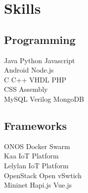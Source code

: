 \documentclass[]{deedy-resume-openfont}
\begin{document}
\begin{minipage}[t]{0.33\textwidth}
%


\section{Skills}
\subsection{Programming}
Java \textbullet{}  Python \textbullet{} Javascript \\
Android \textbullet{}  Node.js  \\
 C \textbullet{} C++ \textbullet{} VHDL \textbullet{}  PHP \\


CSS \textbullet{} Assembly \\
MySQL \textbullet{} Verilog \textbullet{} MongoDB \\

\sectionsep

\subsection{Frameworks}
ONOS \textbullet{} Docker \textbullet{} Swarm \\
Kaa IoT Platform \\ Lelylan IoT Platform \textbullet{} \\
OpenStack \textbullet{} Open vSwtich \textbullet{} \\
Mininet \textbullet{} Hapi.js \textbullet{} Vue.js
\sectionsep



\end{minipage}
\end{document}
